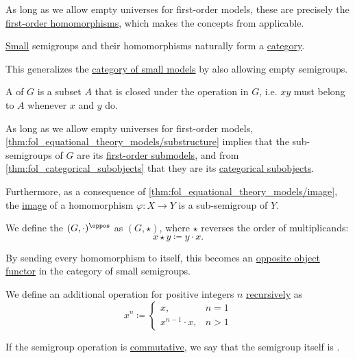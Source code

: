 \begin{definition}
\begin{thmenum}[series=def:semigroup]
    As long as we allow empty universes for first-order models, these are precisely the \hyperref[def:fol_homomorphism]{first-order homomorphisms}, which makes the concepts from  applicable.

     \hyperref[def:small_set]{Small} semigroups and their homomorphisms naturally form a \hyperref[def:category]{category}.

    This generalizes the \hyperref[def:fol_theory_model_functor/obj]{category of small models} by also allowing empty semigroups.

     A  of \( G \) is a subset \( A \) that is closed under the operation in \( G \), i.e. \( xy \) must belong to \( A \) whenever \( x \) and \( y \) do.

    As long as we allow empty universes for first-order models, \cref{thm:fol_equational_theory_models/substructure} implies that the sub-semigroups of \( G \) are its \hyperref[def:fol_substructure/submodel]{first-order submodels}, and from \cref{thm:fol_categorical_subobjects} that they are its \hyperref[def:categorical_subobject]{categorical subobjects}.

    Furthermore, as a consequence of \cref{thm:fol_equational_theory_models/image}, the \hyperref[def:set_valued_function/image]{image} of a homomorphism \( \varphi: X \to Y \) is a sub-semigroup of \( Y \).

    \mimprovised We define the  \( (G, \cdot)^\oppos \) as \( (G, \star) \), where \( {\star} \) reverses the order of multiplicands:
    \begin{equation*}
      x \star y \coloneqq y \cdot x.
    \end{equation*}

    By sending every homomorphism to itself, this becomes an \hyperref[con:opposite_object]{opposite object functor} in the category of small semigroups.

     We define an additional  operation for positive integers \( n \) \hyperref[thm:omega_recursion]{recursively} as
    \begin{equation}\label{eq:def:semigroup/exponentiation}
      x^n \coloneqq \begin{cases}
        x,               &n = 1 \\
        x^{n-1} \cdot x, &n > 1
      \end{cases}
    \end{equation}

     If the semigroup operation is \hyperref[def:binary_operation/commutative]{commutative}, we say that the semigroup itself is .
  \end{thmenum}
\end{definition}

